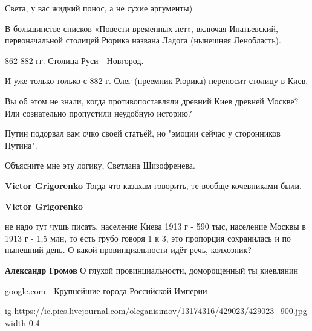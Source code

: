 \begin{itemize}
\begin{itemize}
Света, у вас жидкий понос, а не сухие аргументы)

В большинстве списков «Повести временных лет», включая Ипатьевский,
первоначальной столицей Рюрика названа Ладога (нынешняя Ленобласть).

862-882 гг. Столица Руси - Новгород.

И уже только только с 882 г. Олег (преемник Рюрика) переносит столицу в Киев.

Вы об этом не знали, когда противопоставляли древний Киев древней Москве? Или
сознательно пропустили неудобную историю?

Путин подорвал вам очко своей статьёй, но "эмоции сейчас у сторонников Путина".

Объясните мне эту логику, Светлана Шизофренева.

 
\textbf{Victor Grigorenko} Тогда что казахам говорить, те вообще кочевниками были.

 
\textbf{Victor Grigorenko} 

не надо тут чушь писать, население Киева 1913 г - 590 тыс, население Москвы в
1913 г - 1,5 млн, то есть грубо говоря 1 к 3, это пропорция сохранилась и по
нынешний день. О какой провинциальности идёт речь, колхозник?

 
\textbf{Александр Громов} О глухой провинциальности, доморощенный ты киевлянин

google.com - Крупнейшие города Российской Империи

 
\ifcmt
  ig https://ic.pics.livejournal.com/oleganisimov/13174316/429023/429023_900.jpg
  width 0.4
\fi



\end{itemize}
\end{itemize}
